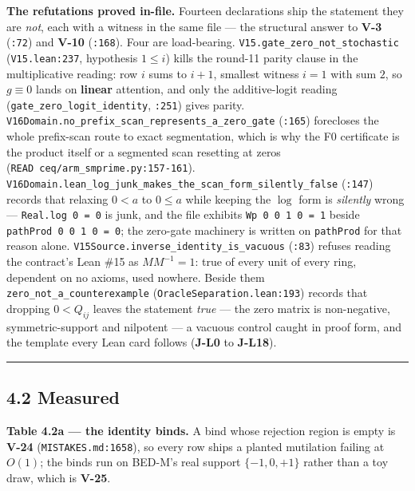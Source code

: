 \documentclass[11pt,a4paper]{article}
\theoremstyle{plain}
\theoremstyle{definition}
\theoremstyle{remark}
\begin{document}
\textbf{The refutations proved in-file.} Fourteen declarations ship the
statement they are \emph{not}, each with a witness in the same file ---
the structural answer to \textbf{V-3} (\texttt{:72}) and \textbf{V-10}
(\texttt{:168}). Four are load-bearing.
\texttt{V15.gate\_zero\_not\_stochastic} (\texttt{V15.lean:237},
hypothesis \(1\le i\)) kills the round-11 parity clause in the
multiplicative reading: row \(i\) sums to \(i+1\), smallest witness
\(i=1\) with sum \(2\), so \(g\equiv 0\) lands on \textbf{linear}
attention, and only the additive-logit reading
(\texttt{gate\_zero\_logit\_identity}, \texttt{:251}) gives parity.
\texttt{V16Domain.no\_prefix\_scan\_represents\_a\_zero\_gate}
(\texttt{:165}) forecloses the whole prefix-scan route to exact
segmentation, which is why the F0 certificate is the product itself or a
segmented scan resetting at zeros
(\texttt{READ\ ceq/arm\_smprime.py:157-161}).
\texttt{V16Domain.lean\_log\_junk\_makes\_the\_scan\_form\_silently\_false}
(\texttt{:147}) records that relaxing \(0<a\) to \(0\le a\) while
keeping the \(\log\) form is \emph{silently} wrong ---
\texttt{Real.log\ 0\ =\ 0} is junk, and the file exhibits
\texttt{Wp\ 0\ 0\ 1\ 0\ =\ 1} beside
\texttt{pathProd\ 0\ 0\ 1\ 0\ =\ 0}; the zero-gate machinery is written
on \texttt{pathProd} for that reason alone.
\texttt{V15Source.inverse\_identity\_is\_vacuous} (\texttt{:83}) refuses
reading the contract's Lean \#15 as \(MM^{-1}=1\): true of every unit of
every ring, dependent on no axioms, used nowhere. Beside them
\texttt{zero\_not\_a\_counterexample}
(\texttt{OracleSeparation.lean:193}) records that dropping \(0<Q_{ij}\)
leaves the statement \emph{true} --- the zero matrix is non-negative,
symmetric-support and nilpotent --- a vacuous control caught in proof
form, and the template every Lean card follows (\textbf{J-L0} to
\textbf{J-L18}).

\begin{center}\rule{0.5\linewidth}{0.5pt}\end{center}

\subsection{4.2 Measured}\label{measured}

\textbf{Table 4.2a --- the identity binds.} A bind whose rejection
region is empty is \textbf{V-24} (\texttt{MISTAKES.md:1658}), so every
row ships a planted mutilation failing at \(O(1)\); the binds run on
BED-M's real support \(\{-1,0,+1\}\) rather than a toy draw, which is
\textbf{V-25}.
\end{document}
